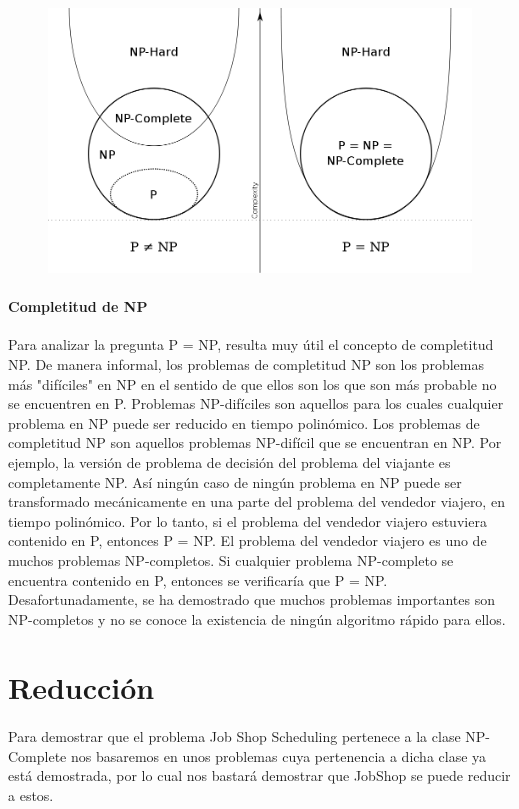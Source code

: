 \documentclass[11pt, a4paper,spanish]{article}
\begin{document}
			\begin{figure}[H]
						\centering
						\includegraphics[width=120mm]{res/pspace.png}
				\end{figure}
				\paragraph{Completitud de NP}
				Para analizar la pregunta P = NP, resulta muy útil el concepto de completitud NP. De manera informal, los problemas de completitud NP son los problemas más "difíciles" en NP en el sentido de que ellos son los que son más probable no se encuentren en P. Problemas NP-difíciles son aquellos para los cuales cualquier problema en NP puede ser reducido en tiempo polinómico. Los problemas de completitud NP son aquellos problemas NP-difícil que se encuentran en NP. Por ejemplo, la versión de problema de decisión del problema del viajante es completamente NP. Así ningún caso de ningún problema en NP puede ser transformado mecánicamente en una parte del problema del vendedor viajero, en tiempo polinómico. Por lo tanto, si el problema del vendedor viajero estuviera contenido en P, entonces P = NP. El problema del vendedor viajero es uno de muchos problemas NP-completos. Si cualquier problema NP-completo se encuentra contenido en P, entonces se verificaría que P = NP. Desafortunadamente, se ha demostrado que muchos problemas importantes son NP-completos y no se conoce la existencia de ningún algoritmo rápido para ellos.
				
		\section{Reducción}
		
			\paragraph{}
			Para demostrar que el problema Job Shop Scheduling pertenece a la clase NP-Complete nos basaremos en unos problemas cuya pertenencia a dicha clase ya está demostrada, por lo cual nos bastará demostrar que JobShop se puede reducir a estos. 
			
\end{document}
